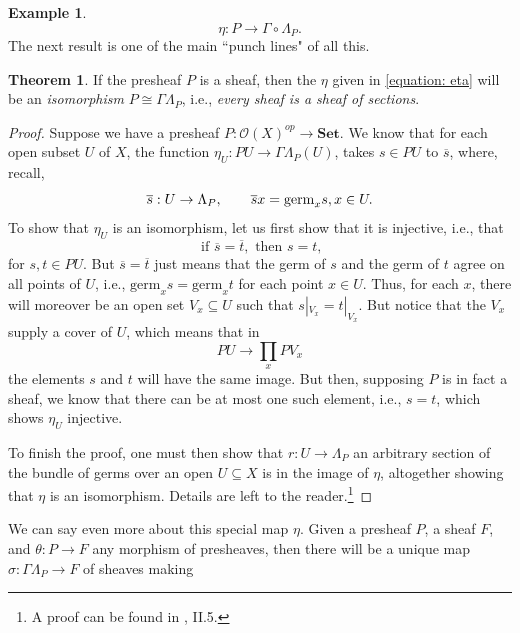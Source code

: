 \documentclass[a4paper]{book}
\theoremstyle{definition}
\newtheorem{example}{Example}[section]
\theoremstyle{definition}
\theoremstyle{definition}
\newtheorem{theorem}{Theorem}[section]
\theoremstyle{theorem}
\theoremstyle{definition}
\begin{document}
\begin{example}
	\begin{equation}\label{equation: eta}
	\eta: P \rightarrow \Gamma \circ \Lambda_P.
	\end{equation}
	The next result is one of the main ``punch lines" of all this.  
	\begin{theorem}
		If the presheaf $P$ is a sheaf, then the $\eta$ given in \ref{equation: eta} will be an \textit{isomorphism} $P \cong \Gamma \Lambda_P$, i.e., \textit{every sheaf is a sheaf of sections}.
	\end{theorem} 
\begin{proof} 
	Suppose we have a presheaf $P: \mathscr{O}(X)^{op} \rightarrow \textbf{Set}$. We know that for each open subset $U$ of $X$, the function $\eta_U: PU \rightarrow \Gamma \Lambda_P (U)$, takes $s \in PU$ to $\overline{s}$, where, recall, 
	\begin{equation*}
	\overline{s}: U \rightarrow \Lambda_P, \hspace*{2em} \overline{s}x = \text{germ}_x s, x \in U.
	\end{equation*} 
	To show that $\eta_U$ is an isomorphism, let us first show that it is injective, i.e., that 
	\begin{equation*}
	\text{ if } \overline{s} = \overline{t}, \text{ then } s = t, 
	\end{equation*}
	for $s, t \in PU$. But $\overline{s} = \overline{t}$ just means that the germ of $s$ and the germ of $t$ agree on all points of $U$, i.e., $\text{germ}_x s = \text{germ}_x t$ for each point $x \in U$. Thus, for each $x$, there will moreover be an open set $V_x \subseteq  U$ such that $s|_{V_x} = t|_{V_x}$. But notice that the $V_x$ supply a cover of $U$, which means that in 
	\begin{equation*}
	PU \rightarrow \prod_x PV_x
	\end{equation*} 
	the elements $s$ and $t$ will have the same image. But then, supposing $P$ is in fact a sheaf, we know that there can be at most one such element, i.e., $s = t$, which shows $\eta_U$ injective. \par 
	To finish the proof, one must then show that $r: U \rightarrow \Lambda_P$ an arbitrary section of the bundle of germs over an open $U \subseteq  X$ is in the image of $\eta$, altogether showing that $\eta$ is an isomorphism. Details are left to the reader.\footnote{A proof can be found in \cite{maclane_sheaves_1994}, II.5.} 
\end{proof}
We can say even more about this special map $\eta$. Given a presheaf $P$, a sheaf $F$, and $\theta: P \rightarrow F$ any morphism of presheaves, then there will be a unique map $\sigma: \Gamma \Lambda_P \rightarrow F$ of sheaves making  

\end{example}
\end{document}
